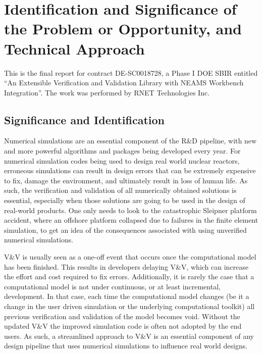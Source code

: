 \section{Identification and Significance of the Problem or Opportunity, and Technical Approach}

This is the final report for contract DE-SC0018728, a Phase I DOE SBIR
entitled ``An Extensible Verification and Validation Library with NEAMS Workbench Integration''. The work was performed by RNET Technologies 
Inc. 

\subsection{Significance and Identification}
\label{intro} 
Numerical simulations are an essential component of the R\&D pipeline, with new and more powerful algorithms and packages being developed every year. For numerical simulation codes being used to design real world nuclear reactors, erroneous simulations can result in design errors that can be extremely expensive to fix, damage the environment, and ultimately result in loss of human life. As such, the verification and validation of all numerically obtained solutions is essential, especially when those solutions are going to be used in the design of real-world products. One only needs to look to the catastrophic Sleipner platform accident, where an offshore platform collapsed due to failures in the finite element simulation, to get an idea of the consequences associated with using unverified numerical simulations. 

V\&V is usually seen as a one-off event that occurs once the computational model has been finished. This results in developers delaying V\&V, which can increase the effort and cost required to fix errors. Additionally, it is rarely the case that a computational model is not under continuous, or at least incremental, development. In that case, each time the computational model changes (be it  a change in the user driven simulation or the underlying computational toolkit) all previous verification and validation of the model becomes void. Without the updated V\&V the improved simulation code is often not adopted by the end users. As such, a streamlined approach to V\&V is an essential component of any design pipeline that uses numerical simulations to influence real world designs.

